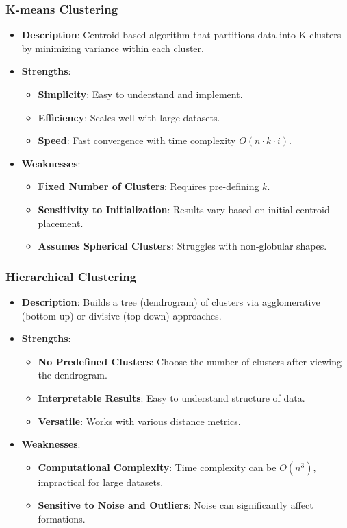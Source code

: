 \documentclass[aspectratio=169]{beamer}
\begin{document}
\begin{frame}[fragile]
    \frametitle{K-means Clustering}
    \begin{itemize}
        \item \textbf{Description}: Centroid-based algorithm that partitions data into K clusters by minimizing variance within each cluster.
        \item \textbf{Strengths}:
        \begin{itemize}
            \item \textbf{Simplicity}: Easy to understand and implement.
            \item \textbf{Efficiency}: Scales well with large datasets.
            \item \textbf{Speed}: Fast convergence with time complexity \(O(n \cdot k \cdot i)\).
        \end{itemize}
        \item \textbf{Weaknesses}:
        \begin{itemize}
            \item \textbf{Fixed Number of Clusters}: Requires pre-defining \(k\).
            \item \textbf{Sensitivity to Initialization}: Results vary based on initial centroid placement.
            \item \textbf{Assumes Spherical Clusters}: Struggles with non-globular shapes.
        \end{itemize}
    \end{itemize}
\end{frame}

\begin{frame}[fragile]
    \frametitle{Hierarchical Clustering}
    \begin{itemize}
        \item \textbf{Description}: Builds a tree (dendrogram) of clusters via agglomerative (bottom-up) or divisive (top-down) approaches.
        \item \textbf{Strengths}:
        \begin{itemize}
            \item \textbf{No Predefined Clusters}: Choose the number of clusters after viewing the dendrogram.
            \item \textbf{Interpretable Results}: Easy to understand structure of data.
            \item \textbf{Versatile}: Works with various distance metrics.
        \end{itemize}
        \item \textbf{Weaknesses}:
        \begin{itemize}
            \item \textbf{Computational Complexity}: Time complexity can be \(O(n^3)\), impractical for large datasets.
            \item \textbf{Sensitive to Noise and Outliers}: Noise can significantly affect formations.
        \end{itemize}
    \end{itemize}
\end{frame}
\end{document}
